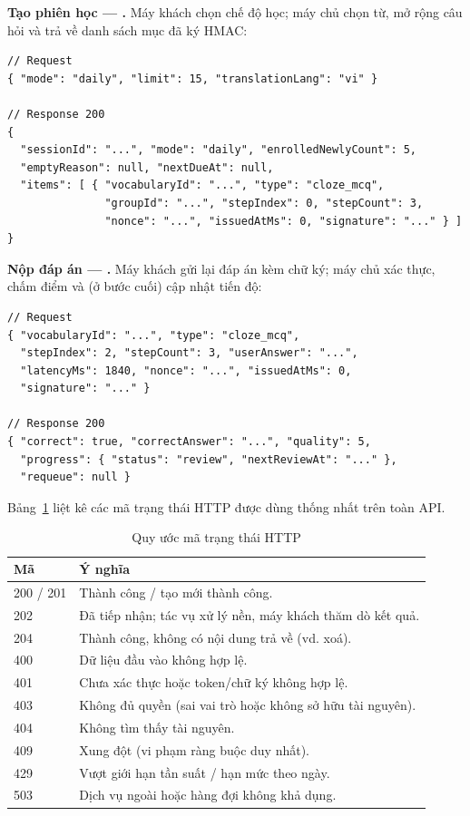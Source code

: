 \textbf{Tạo phiên học --- .} Máy khách chọn
chế độ học; máy chủ chọn từ, mở rộng câu hỏi và trả về danh sách mục đã ký
HMAC:

\begin{verbatim}
// Request
{ "mode": "daily", "limit": 15, "translationLang": "vi" }

// Response 200
{
  "sessionId": "...", "mode": "daily", "enrolledNewlyCount": 5,
  "emptyReason": null, "nextDueAt": null,
  "items": [ { "vocabularyId": "...", "type": "cloze_mcq",
               "groupId": "...", "stepIndex": 0, "stepCount": 3,
               "nonce": "...", "issuedAtMs": 0, "signature": "..." } ]
}
\end{verbatim}

\textbf{Nộp đáp án --- .} Máy khách gửi lại
đáp án kèm chữ ký; máy chủ xác thực, chấm điểm và (ở bước cuối) cập nhật
tiến độ:

\begin{verbatim}
// Request
{ "vocabularyId": "...", "type": "cloze_mcq",
  "stepIndex": 2, "stepCount": 3, "userAnswer": "...",
  "latencyMs": 1840, "nonce": "...", "issuedAtMs": 0,
  "signature": "..." }

// Response 200
{ "correct": true, "correctAnswer": "...", "quality": 5,
  "progress": { "status": "review", "nextReviewAt": "..." },
  "requeue": null }
\end{verbatim}

Bảng~\ref{tab:api-codes} liệt kê các mã trạng thái HTTP được dùng thống nhất
trên toàn API.

\begin{table}[h]
  \centering
  \small
  \renewcommand{\arraystretch}{1.3}
  \begin{tabular}{|p{2.0cm}|p{12.4cm}|}
    \hline
    \textbf{Mã} & \textbf{Ý nghĩa} \\
    \hline
    200 / 201 & Thành công / tạo mới thành công. \\
    \hline
    202 & Đã tiếp nhận; tác vụ xử lý nền, máy khách thăm dò kết quả. \\
    \hline
    204 & Thành công, không có nội dung trả về (vd. xoá). \\
    \hline
    400 & Dữ liệu đầu vào không hợp lệ. \\
    \hline
    401 & Chưa xác thực hoặc token/chữ ký không hợp lệ. \\
    \hline
    403 & Không đủ quyền (sai vai trò hoặc không sở hữu tài nguyên). \\
    \hline
    404 & Không tìm thấy tài nguyên. \\
    \hline
    409 & Xung đột (vi phạm ràng buộc duy nhất). \\
    \hline
    429 & Vượt giới hạn tần suất / hạn mức theo ngày. \\
    \hline
    503 & Dịch vụ ngoài hoặc hàng đợi không khả dụng. \\
    \hline
  \end{tabular}
  \caption{Quy ước mã trạng thái HTTP}
  \label{tab:api-codes}
\end{table}

